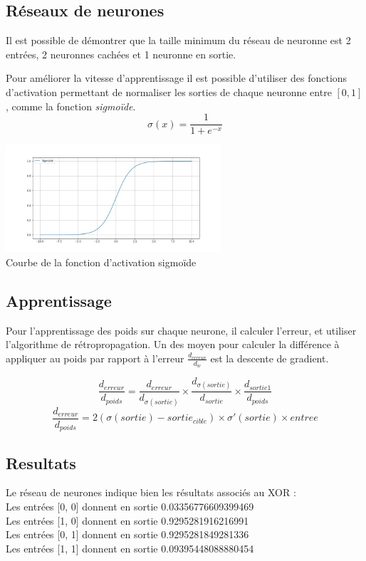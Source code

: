 \documentclass[12pt,a4paper, french]{article}
\begin{document}
\subsection{Réseaux de neurones}
Il est possible de démontrer que la taille minimum du réseau de neuronne est 2 entrées, 2 neuronnes cachées et 1 neuronne en sortie.  

Pour améliorer la vitesse d'apprentissage il est possible d'utiliser des fonctions d'activation permettant de normaliser les sorties de chaque neuronne entre $[0, 1]$, comme la fonction \textit{sigmoïde}.
\begin{equation}
	\sigma(x) = \frac{1}{1+e^{-x}}
\end{equation}

\begin{center}
    \includegraphics[height=4cm]{1-trace sigmoid.jpg} \\
    Courbe de la fonction d'activation sigmoïde
\end{center}


\subsection{Apprentissage}
Pour l'apprentissage des poids sur chaque neurone, il calculer l'erreur, et utiliser l'algorithme de rétropropagation. Un des moyen pour calculer la différence à appliquer au poids par rapport à l'erreur $\frac{d_{erreur}}{d_w}$ est la descente de gradient.

\begin{equation}
	\frac{d_{erreur}}{d_{poids}} = 
		\frac{d_{erreur}}{d_{\sigma(sortie)}} 
		\times 
		\frac{d_{\sigma(sortie)}}{d_{sortie}} 
		\times 
		\frac{d_{sortie1}}{d_{poids}}   
\end{equation}
\begin{equation}
	\frac{d_{erreur}}{d_{poids}} = 
		2(\sigma(sortie) - sortie_{cible})
		\times 
		\sigma'(sortie)
		\times 
		entree  
\end{equation}

\subsection{Resultats}
Le réseau de neurones indique bien les résultats associés au XOR :
\\
\noindent 
\textsf{
Les entrées [0, 0] donnent en sortie 0.03356776609399469 \\ 
Les entrées [1, 0] donnent en sortie 0.9295281916216991  \\
Les entrées [0, 1] donnent en sortie 0.9295281849281336  \\
Les entrées [1, 1] donnent en sortie 0.09395448088880454  \\
}
\end{document}
